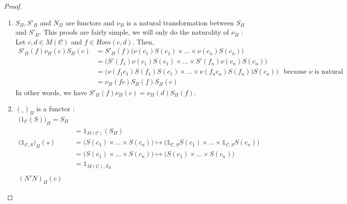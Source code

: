\documentclass{report}
\newcommand{\prodmon}{\Pi}
\begin{document}
\begin{proof}
    \begin{enumerate}
        \item $S_\prodmon, S'_\prodmon$ and $N_\prodmon$ are functors and $\nu_\prodmon$ is a natural transformation between $S_\prodmon$ and $S'_\prodmon$. This proofs are fairly simple, we will only do the naturality of $\nu_\prodmon$ : \newline
              Let $c,d \in M(\mathcal{C})$ and $ f\in Hom(c,d)$. Then,
              \begin{align*}
                  S'_\prodmon(f) \nu_\prodmon(c) S_\prodmon(c)
                   & = S'_\prodmon(f) \big( \nu(c_1) S(c_1)\times\dots\times \nu(c_n) S(c_n)\big)     &                                 \\
                   & =  \big( S'(f_1)\nu(c_1) S(c_1)\times\dots\times S'(f_n)\nu(c_n) S(c_n)\big)     &                                 \\
                   & =  \big( \nu(f_1c_1)S(f_1)S(c_1)\times\dots\times \nu(f_nc_n)S(f_n)) S(c_n)\big) & \text{because $\nu$ is natural} \\
                   & = \nu_\prodmon(fc)S_\prodmon(f)S_\prodmon(c)                                     &
              \end{align*}
              In other words, we have $ S'_\prodmon(f) \nu_\prodmon(c) = \nu_\prodmon(d)S_\prodmon(f)$.
        \item $(\_)_\prodmon$ is a functor :
              \begin{align*}
                  \big(1_{\mathcal{C}}(S)\big)_\prodmon = S_\prodmon       \\
                   & =  1_{M(\mathcal{C})}(S_\prodmon)                     \\
                  \big(\mathds{1}_{\mathcal{C},S}\big)_\prodmon(s)
                   & = \big(S(c_1)\times\dots\times S(c_n)\big)
                  \mapsto \big(\mathds{1}_{\mathcal{C},S} S(c_1)
                  \times\dots\times \mathds{1}_{\mathcal{C},S} S(c_n)\big) \\
                   & = \big(S(c_1)\times\dots\times S(c_n)\big)
                  \mapsto  \big(S(c_1)\times\dots\times S(c_n)\big)        \\
                   & = \mathds{1}_{M(\mathcal{C}),S_\prodmon}              \\
                   &                                                       \\
                  (N'N)_\prodmon(c)

\end{align*}
\end{enumerate}
\end{proof}
\end{document}
